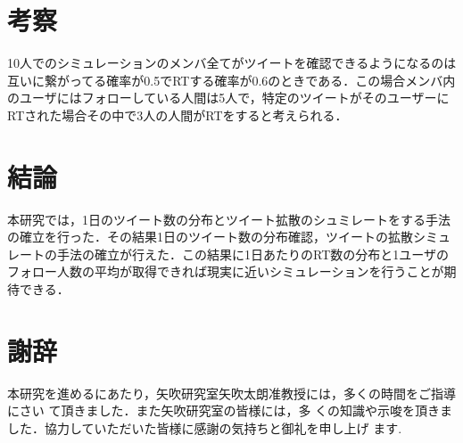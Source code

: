 \chapter{考察}

10人でのシミュレーションのメンバ全てがツイートを確認できるようになるのは互いに繋がってる確率が0.5でRTする確率が0.6のときである．この場合メンバ内のユーザにはフォローしている人間は5人で，特定のツイートがそのユーザーにRTされた場合その中で3人の人間がRTをすると考えられる．

\chapter{結論}

本研究では，1日のツイート数の分布とツイート拡散のシュミレートをする手法の確立を行った．その結果1日のツイート数の分布確認，ツイートの拡散シミュレートの手法の確立が行えた．この結果に1日あたりのRT数の分布と1ユーザのフォロー人数の平均が取得できれば現実に近いシミュレーションを行うことが期待できる．





\chapter*{謝辞}

本研究を進めるにあたり，矢吹研究室矢吹太朗准教授には，多くの時間をご指導にさい て頂きました．また矢吹研究室の皆様には，多 くの知識や示唆を頂きました．協力していただいた皆様に感謝の気持ちと御礼を申し上げ ます.

